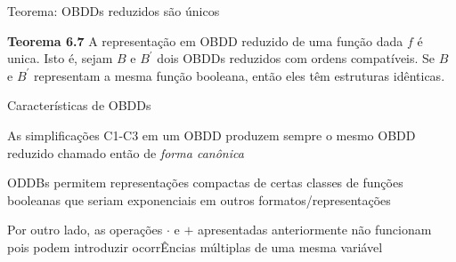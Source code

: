 \expandafter\documentclass\expandafter[table, usenames, svgnames, dvipsnames,14pt, \classopts]{beamer}
\begin{document}
\begin{frame}{Teorema: OBDDs reduzidos são únicos}

    \begin{block}{\textbf{Teorema 6.7}}
        A representação em OBDD reduzido de uma função dada $f$ é unica. Isto é, sejam $B$ e $B^\prime$ dois OBDDs reduzidos com ordens compatíveis. Se $B$ e $B^\prime$ representam a mesma função booleana, então eles têm estruturas idênticas.
    \end{block}

\end{frame}

\begin{frame}{Características de \uppercase{OBDD}s}

    \begin{outline}
        \1 As simplificações C1-C3 em um OBDD produzem sempre o mesmo OBDD reduzido
            \2[-] chamado então de \textit{forma canônica}
        
        \vspace{1em}
        
        \1 ODDBs permitem representações compactas de certas classes de funções booleanas
            \2[-] que seriam exponenciais em outros formatos/representações
            
        \vspace{1em}
        
        \1 Por outro lado, as operações $\cdot$ e $+$ apresentadas anteriormente não funcionam
            \2[-] pois podem introduzir ocorrÊncias múltiplas de uma mesma variável
    \end{outline}

\end{frame}
\end{document}

